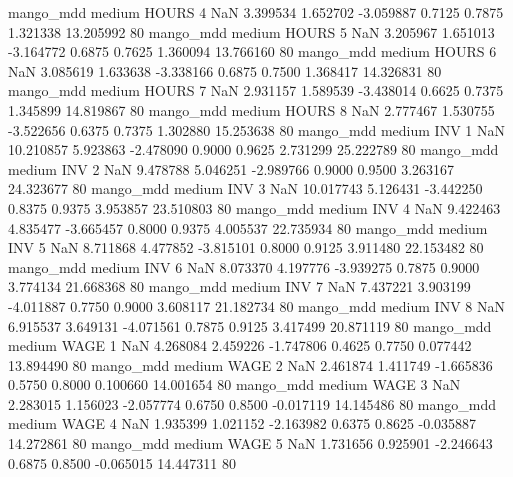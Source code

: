         mango_mdd     medium    HOURS                 4                  NaN  3.399534 1.652702 -3.059887 0.7125 0.7875  1.321338   13.205992 80
        mango_mdd     medium    HOURS                 5                  NaN  3.205967 1.651013 -3.164772 0.6875 0.7625  1.360094   13.766160 80
        mango_mdd     medium    HOURS                 6                  NaN  3.085619 1.633638 -3.338166 0.6875 0.7500  1.368417   14.326831 80
        mango_mdd     medium    HOURS                 7                  NaN  2.931157 1.589539 -3.438014 0.6625 0.7375  1.345899   14.819867 80
        mango_mdd     medium    HOURS                 8                  NaN  2.777467 1.530755 -3.522656 0.6375 0.7375  1.302880   15.253638 80
        mango_mdd     medium      INV                 1                  NaN 10.210857 5.923863 -2.478090 0.9000 0.9625  2.731299   25.222789 80
        mango_mdd     medium      INV                 2                  NaN  9.478788 5.046251 -2.989766 0.9000 0.9500  3.263167   24.323677 80
        mango_mdd     medium      INV                 3                  NaN 10.017743 5.126431 -3.442250 0.8375 0.9375  3.953857   23.510803 80
        mango_mdd     medium      INV                 4                  NaN  9.422463 4.835477 -3.665457 0.8000 0.9375  4.005537   22.735934 80
        mango_mdd     medium      INV                 5                  NaN  8.711868 4.477852 -3.815101 0.8000 0.9125  3.911480   22.153482 80
        mango_mdd     medium      INV                 6                  NaN  8.073370 4.197776 -3.939275 0.7875 0.9000  3.774134   21.668368 80
        mango_mdd     medium      INV                 7                  NaN  7.437221 3.903199 -4.011887 0.7750 0.9000  3.608117   21.182734 80
        mango_mdd     medium      INV                 8                  NaN  6.915537 3.649131 -4.071561 0.7875 0.9125  3.417499   20.871119 80
        mango_mdd     medium     WAGE                 1                  NaN  4.268084 2.459226 -1.747806 0.4625 0.7750  0.077442   13.894490 80
        mango_mdd     medium     WAGE                 2                  NaN  2.461874 1.411749 -1.665836 0.5750 0.8000  0.100660   14.001654 80
        mango_mdd     medium     WAGE                 3                  NaN  2.283015 1.156023 -2.057774 0.6750 0.8500 -0.017119   14.145486 80
        mango_mdd     medium     WAGE                 4                  NaN  1.935399 1.021152 -2.163982 0.6375 0.8625 -0.035887   14.272861 80
        mango_mdd     medium     WAGE                 5                  NaN  1.731656 0.925901 -2.246643 0.6875 0.8500 -0.065015   14.447311 80

